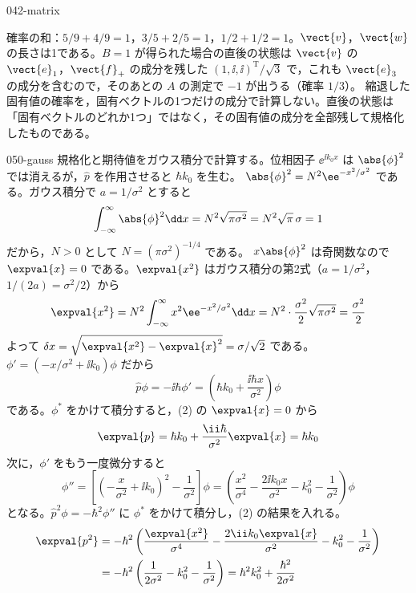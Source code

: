 \documentclass[uplatex,dvipdfmx,a4paper,11pt]{jsarticle}
\begin{document}
\begin{kaisetsu}{042-matrix}
\begin{ronten}
\end{ronten}
\kenzan 確率の和：$5/9+4/9=1$，$3/5+2/5=1$，$1/2+1/2=1$。$\vect{v}$，$\vect{w}$ の長さは1である。$B=1$ が得られた場合の直後の状態は $\vect{v}$ の $\vect{e}_{1}$，$\vect{f}_{+}$ の成分を残した $(1,\ii,\ii)^{\mathrm{T}}/\sqrt{3}$ で，これも $\vect{e}_{3}$ の成分を含むので，そのあとの $A$ の測定で $-1$ が出うる（確率 $1/3$）。
\tsumazuki 縮退した固有値の確率を，固有ベクトルの1つだけの成分で計算しない。直後の状態は「固有ベクトルのどれか1つ」ではなく，その固有値の成分を全部残して規格化したものである。
\end{kaisetsu}

\begin{kaisetsu}{050-gauss}
\houshin 規格化と期待値をガウス積分で計算する。位相因子 $\ee^{\ii k_{0}x}$ は $\abs{\phi}^{2}$ では消えるが，$\hat{p}$ を作用させると $\hbar k_{0}$ を生む。
\keisan {} $\abs{\phi}^{2}=N^{2}\ee^{-x^{2}/\sigma^{2}}$ である。ガウス積分で $a=1/\sigma^{2}$ とすると
\[ \int_{-\infty}^{\infty}\abs{\phi}^{2}\dd x=N^{2}\sqrt{\pi\sigma^{2}}=N^{2}\sqrt{\pi}\,\sigma=1 \]
だから，$N>0$ として $N=(\pi\sigma^{2})^{-1/4}$ である。
 $x\abs{\phi}^{2}$ は奇関数なので $\expval{x}=0$ である。$\expval{x^{2}}$ はガウス積分の第2式（$a=1/\sigma^{2}$，$1/(2a)=\sigma^{2}/2$）から
\[ \expval{x^{2}}=N^{2}\int_{-\infty}^{\infty}x^{2}\ee^{-x^{2}/\sigma^{2}}\dd x=N^{2}\cdot\frac{\sigma^{2}}{2}\sqrt{\pi\sigma^{2}}=\frac{\sigma^{2}}{2} \]
よって $\delta x=\sqrt{\expval{x^{2}}-\expval{x}^{2}}=\sigma/\sqrt{2}$ である。
 $\phi'=(-x/\sigma^{2}+\ii k_{0})\phi$ だから
\[ \hat{p}\phi=-\ii\hbar\phi'=\left(\hbar k_{0}+\frac{\ii\hbar x}{\sigma^{2}}\right)\phi \]
である。$\phi^{*}$ をかけて積分すると，(2) の $\expval{x}=0$ から
\[ \expval{p}=\hbar k_{0}+\frac{\ii\hbar}{\sigma^{2}}\expval{x}=\hbar k_{0} \]
次に，$\phi'$ をもう一度微分すると
\[ \phi''=\left[\left(-\frac{x}{\sigma^{2}}+\ii k_{0}\right)^{2}-\frac{1}{\sigma^{2}}\right]\phi=\left(\frac{x^{2}}{\sigma^{4}}-\frac{2\ii k_{0}x}{\sigma^{2}}-k_{0}^{2}-\frac{1}{\sigma^{2}}\right)\phi \]
となる。$\hat{p}^{2}\phi=-\hbar^{2}\phi''$ に $\phi^{*}$ をかけて積分し，(2) の結果を入れる。
\begin{align*}
\expval{p^{2}}&=-\hbar^{2}\left(\frac{\expval{x^{2}}}{\sigma^{4}}-\frac{2\ii k_{0}\expval{x}}{\sigma^{2}}-k_{0}^{2}-\frac{1}{\sigma^{2}}\right)\\
&=-\hbar^{2}\left(\frac{1}{2\sigma^{2}}-k_{0}^{2}-\frac{1}{\sigma^{2}}\right)=\hbar^{2}k_{0}^{2}+\frac{\hbar^{2}}{2\sigma^{2}}
\end{align*}

\end{kaisetsu}
\end{document}

